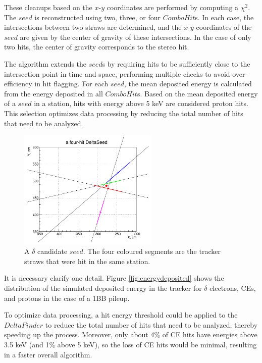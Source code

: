 These cleanups based on the $x$-$y$ 
coordinates are performed 
by computing a $\chi^2$. The $seed$ 
is reconstructed using 
two, three, or four $ComboHit$s. 
In each case, the 
intersections between two straws 
are determined, 
and the $x$-$y$ coordinates of 
the $seed$ are given 
by the center of gravity of 
these intersections. 
In the case of only two hits, 
the center of gravity 
corresponds to the stereo hit. 

The algorithm extends the $seed$s by requiring 
hits to be sufficiently close to the intersection 
point in time and space, performing multiple checks 
to avoid over-efficiency in 
hit flagging. For each $seed$, 
the mean deposited energy is calculated from the energy 
deposited in all $ComboHit$s. Based on the mean 
deposited energy of a $seed$ in a station, hits with 
energy above 5 keV are considered proton hits. 
This selection optimizes data processing by 
reducing the total number of hits that need to be analyzed.

\begin{figure}[!h]
    \centering
    \includegraphics[width =0.6\textwidth]{figures/png/Screenshot_20240811_115854.png}
    \caption[A $\delta$ candidate $seed$.]{A 
    $\delta$ candidate $seed$. The four 
    coloured segments are the tracker straws that were
    hit in the same station.}
    \label{fig:deltaseeds}
\end{figure}

It is necessary clarify one detail. 
Figure \ref{fig:energydeposited} shows the 
distribution of the simulated deposited energy 
in the tracker for $\delta$ electrons, CEs, and 
protons in the case of a 1BB pileup. 

To optimize data processing, a hit energy 
threshold could be applied to the $DeltaFinder$ 
to reduce the total number of hits that 
need to be analyzed, 
thereby speeding up the process. Moreover, only about 
4\% of CE hits have energies above 3.5 keV 
(and 1\% above 5 keV), so the loss of CE 
hits would be minimal, resulting in a 
faster overall algorithm. 

